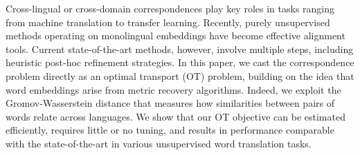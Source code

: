 Cross-lingual or cross-domain correspondences play key roles in tasks ranging from machine translation to transfer learning. Recently, purely unsupervised methods operating on monolingual embeddings have become effective alignment tools. Current state-of-the-art methods, however, involve multiple steps, including heuristic post-hoc refinement strategies. In this paper, we cast the correspondence problem directly as an optimal transport (OT) problem, building on the idea that word embeddings arise from metric recovery algorithms. Indeed, we exploit the Gromov-Wasserstein distance that measures how similarities between pairs of words relate across languages. We show that our OT objective can be estimated efficiently, requires little or no tuning, and results in performance comparable with the state-of-the-art in various unsupervised word translation tasks.
